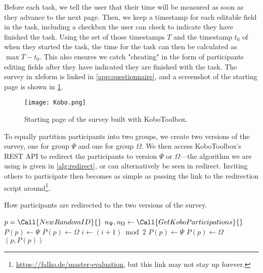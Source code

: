 \documentclass[../thesis]{subfiles}
\begin{document}
Before each task, we tell the user that their time will be measured as soon as they advance to the next page.
Then, we keep a timestamp for each editable field in the task, including a checkbox the user can check to indicate they have finished the task.
Using the set of those timestamps $T$ and the timestamp $t_0$ of when they started the task, the time for the task can then be calculated as $\max T - t_0$.
This also ensures we catch "cheating" in the form of participants editing fields after they have indicated they are finished with the task.
The survey in \gls{xlsform} is linked in \cref{app:questionnaire}, and a screenshot of the starting page is shown in \cref{fig:kobo}.

\begin{figure}
	\begin{center}
		\texttt{[image: Kobo.png]}
	\end{center}
	\caption{Starting page of the survey built with KoboToolbox.}\label{fig:kobo}
\end{figure}


To equally partition participants into two groups, we create two versions of the survey, one for group $\Psi$ and one for group $\Omega$.
We then access KoboToolbox's REST API to redirect the participants to version $\Psi$ or $\Omega$---the algorithm we are using is given in \cref{alg:redirect}, or can alternatively be seen in \gls{redirect}.
Inviting others to participate then becomes as simple as passing the link to the redirection script around\footnote{
	\url{https://falko.de/master-evaluation}, but this link may not stay up forever.
}.

\begin{algorithm}
	\tikzexternaldisable
	\caption{How participants are redirected to the two versions of the survey.}\label{alg:redirect}
	\begin{algorithmic}[1]
		\small
		\State $p = \Call{NewRandomID}{\null}$
		\EndIf
		\State $n_{\Psi}, n_{\Omega} \gets \Call{GetKoboParticipations}{\null}$
		\State $P(p) \gets \Psi$
		\Else
		\State $P(p) \gets \Omega$
		\EndIf
		\State $i \gets (i + 1) \bmod 2$
		\State $P(p) \gets \Psi$
		\Else
		\State $P(p) \gets \Omega$
		\EndIf
		\EndIf
		\State \Return $(p, P(p))$
	\end{algorithmic}
	\tikzexternalenable
\end{algorithm}
\end{document}
